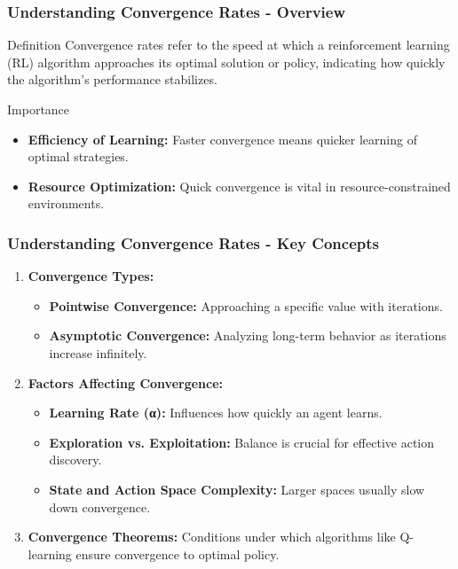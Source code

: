 \documentclass[aspectratio=169]{beamer}
\begin{document}
\begin{frame}[fragile]
    \frametitle{Understanding Convergence Rates - Overview}
    \begin{block}{Definition}
        Convergence rates refer to the speed at which a reinforcement learning (RL) algorithm approaches its optimal solution or policy, indicating how quickly the algorithm's performance stabilizes.
    \end{block}
    \begin{block}{Importance}
        \begin{itemize}
            \item \textbf{Efficiency of Learning:} Faster convergence means quicker learning of optimal strategies.
            \item \textbf{Resource Optimization:} Quick convergence is vital in resource-constrained environments.
        \end{itemize}
    \end{block}
\end{frame}

\begin{frame}[fragile]
    \frametitle{Understanding Convergence Rates - Key Concepts}
    \begin{enumerate}
        \item \textbf{Convergence Types:}
            \begin{itemize}
                \item \textbf{Pointwise Convergence:} Approaching a specific value with iterations.
                \item \textbf{Asymptotic Convergence:} Analyzing long-term behavior as iterations increase infinitely.
            \end{itemize}
        \item \textbf{Factors Affecting Convergence:}
            \begin{itemize}
                \item \textbf{Learning Rate (α):} Influences how quickly an agent learns.
                \item \textbf{Exploration vs. Exploitation:} Balance is crucial for effective action discovery.
                \item \textbf{State and Action Space Complexity:} Larger spaces usually slow down convergence.
            \end{itemize}
        \item \textbf{Convergence Theorems:} Conditions under which algorithms like Q-learning ensure convergence to optimal policy.
    \end{enumerate}
\end{frame}
\end{document}
